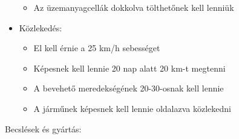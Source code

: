 \documentclass[12pt]{report}
\begin{document}
\begin{itemize}
\begin{itemize}
            \item Az üzemanyagcellák dokkolva tölthetőnek kell lenniük
        \end{itemize}
    \item {} Közlekedés:
        \begin{itemize}
            \item El kell érnie a  25 km/h sebességet
            \item Képesnek kell lennie 20 nap alatt 20 km-t megtenni
            \item A bevehető meredekségének 20-30-osnak kell lennie
            \item A járműnek képesnek kell lennie oldalazva közlekedni
        \end{itemize}
\end{itemize}

Becslések és gyártás:
\end{document}
